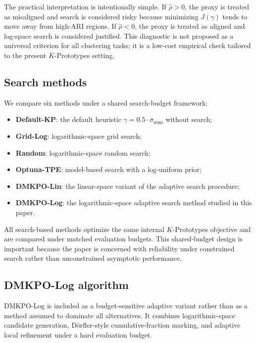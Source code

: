 \documentclass[10pt,lineno]{wlpeerj}
\begin{document}
The practical interpretation is intentionally simple. If $\hat{\rho} > 0$, the proxy is treated as misaligned and search is considered risky because minimizing $J(\gamma)$ tends to move away from high-ARI regions. If $\hat{\rho} < 0$, the proxy is treated as aligned and log-space search is considered justified. This diagnostic is not proposed as a universal criterion for all clustering tasks; it is a low-cost empirical check tailored to the present $K$-Prototypes setting.

\subsection*{Search methods}

We compare six methods under a shared search-budget framework:
\begin{itemize}[leftmargin=2em]
    \item \textbf{Default-KP}: the default heuristic $\gamma = 0.5 \cdot \overline{\sigma}_{\mathrm{num}}$ without search;
    \item \textbf{Grid-Log}: logarithmic-space grid search;
    \item \textbf{Random}: logarithmic-space random search;
    \item \textbf{Optuna-TPE}: model-based search with a log-uniform prior;
    \item \textbf{DMKPO-Lin}: the linear-space variant of the adaptive search procedure;
    \item \textbf{DMKPO-Log}: the logarithmic-space adaptive search method studied in this paper.
\end{itemize}

All search-based methods optimize the same internal $K$-Prototypes objective and are compared under matched evaluation budgets. This shared-budget design is important because the paper is concerned with reliability under constrained search rather than unconstrained asymptotic performance.

\subsection*{DMKPO-Log algorithm}

DMKPO-Log is included as a budget-sensitive adaptive variant rather than as a method assumed to dominate all alternatives. It combines logarithmic-space candidate generation, D\"orfler-style cumulative-fraction marking, and adaptive local refinement under a hard evaluation budget.
\end{document}
